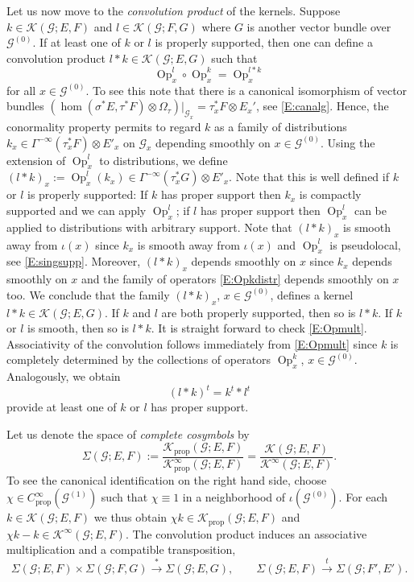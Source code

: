 \documentclass[reqno,12pt]{amsart}
\DeclareMathOperator{\Op}{Op}
\newcommand\prop{\textrm{prop}}
\theoremstyle{plain}
\theoremstyle{definition}
\begin{document}
Let us now move to the \emph{convolution product} of the kernels.
Suppose $k\in\mathcal K(\mathcal G;E,F)$ and $l\in\mathcal K(\mathcal G;F,G)$ where $G$ is another vector bundle over $\mathcal G^{(0)}$.
If at least one of $k$ or $l$ is properly supported, then one can define a convolution product $l*k\in\mathcal K(\mathcal G;E,G)$ such that 
\begin{equation}\label{E:Opmult}
\Op_x^l\circ\Op_x^k=\Op_x^{l*k}
\end{equation}
for all $x\in\mathcal G^{(0)}$.
To see this note that there is a canonical isomorphism of vector bundles $(\hom(\sigma^*E,\tau^*F)\otimes\Omega_\tau)|_{\mathcal G_x}=\tau_x^*F\otimes E_x'$, see \eqref{E:canalg}.
Hence, the conormality property permits to regard $k$ as a family of distributions $k_x\in\Gamma^{-\infty}(\tau_x^*F)\otimes E'_x$ on $\mathcal G_x$ depending smoothly on $x\in\mathcal G^{(0)}$.
Using the extension of $\Op^l_x$ to distributions, we define $(l*k)_x:=\Op^l_x(k_x)\in\Gamma^{-\infty}(\tau_x^*G)\otimes E'_x$.
Note that this is well defined if $k$ or $l$ is properly supported: If $k$ has proper support then $k_x$ is compactly supported and we can apply $\Op^l_x$; if $l$ has proper support then $\Op^l_x$ can be applied to distributions with arbitrary support.
Note that $(l*k)_x$ is smooth away from $\iota(x)$ since $k_x$ is smooth away from $\iota(x)$ and $\Op^l_x$ is pseudolocal, see \eqref{E:singsupp}.
Moreover, $(l*k)_x$ depends smoothly on $x$ since $k_x$ depends smoothly on $x$ and the family of operators \eqref{E:Opkdistr} depends smoothly on $x$ too.
We conclude that the family $(l*k)_x$, $x\in\mathcal G^{(0)}$, defines a kernel $l*k\in\mathcal K(\mathcal G;E,G)$.
If $k$ and $l$ are both properly supported, then so is $l*k$.
If $k$ or $l$ is smooth, then so is $l*k$.
It is straight forward to check \eqref{E:Opmult}.
Associativity of the convolution follows immediately from \eqref{E:Opmult} since $k$ is completely determined by the collections of operators $\Op^k_x$, $x\in\mathcal G^{(0)}$.
Analogously, we obtain
$$
(l*k)^t=k^t*l^t
$$
provide at least one of $k$ or $l$ has proper support.


Let us denote the space of \emph{complete cosymbols} by
$$
\Sigma(\mathcal G;E,F):=\frac{\mathcal K_\prop(\mathcal G;E,F)}{\mathcal K_\prop^\infty(\mathcal G;E,F)}
=\frac{\mathcal K(\mathcal G;E,F)}{\mathcal K^\infty(\mathcal G;E,F)}.
$$
To see the canonical identification on the right hand side, choose $\chi\in C^\infty_\prop(\mathcal G^{(1)})$ such that $\chi\equiv1$ in a neighborhood of $\iota(\mathcal G^{(0)})$.
For each $k\in\mathcal K(\mathcal G;E,F)$ we thus obtain $\chi k\in\mathcal K_\prop(\mathcal G;E,F)$ and $\chi k-k\in\mathcal K^\infty(\mathcal G;E,F)$.
The convolution product induces an associative multiplication and a compatible transposition,
$$
\Sigma(\mathcal G;E,F)\times\Sigma(\mathcal G;F,G)\xrightarrow*\Sigma(\mathcal G;E,G),\qquad
\Sigma(\mathcal G;E,F)\xrightarrow{t}\Sigma(\mathcal G;F',E').
$$
\end{document}
